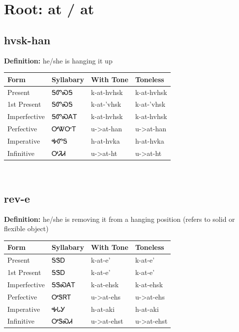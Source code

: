 \documentclass{article}%
\begin{document}
%
\normalsize%
\section*{Root: at / at}%
\subsection*{hvsk-han}%
\textbf{Definition: }%
he/she is hanging it up%
\\[0.5em]%
\begin{tabular}{|l|l|l|l|}%
\hline%
\textbf{Form}&\textbf{Syllabary}&\textbf{With Tone}&\textbf{Toneless}\\%
\hline%
Present&ᎦᏛᏍᎦ&k{-}at{-}hvhsk&k{-}at{-}hvhsk\\%
1st Present&ᎦᏛᏍᎦ&k{-}at{-}'vhsk&k{-}at{-}'vhsk\\%
Imperfective&ᎦᏛᏍᎪᎢ&k{-}at{-}hvhsk&k{-}at{-}hvhsk\\%
Perfective&ᎤᏔᏅᎢ&u{-}>at{-}han&u{-}>at{-}han\\%
Imperative&ᎭᏛᎦ&h{-}at{-}hvka&h{-}at{-}hvka\\%
Infinitive&ᎤᏘᏗ&u{-}>at{-}ht&u{-}>at{-}ht\\%
\hline%
\end{tabular}%
\\[1em]%
\subsection*{rev-e}%
\textbf{Definition: }%
he/she is removing it from a hanging position (refers to solid or flexible object)%
\\[0.5em]%
\begin{tabular}{|l|l|l|l|}%
\hline%
\textbf{Form}&\textbf{Syllabary}&\textbf{With Tone}&\textbf{Toneless}\\%
\hline%
Present&ᎦᏕᎠ&k{-}at{-}e'&k{-}at{-}e'\\%
1st Present&ᎦᏕᎠ&k{-}at{-}e'&k{-}at{-}e'\\%
Imperfective&ᎦᏕᏍᎪᎢ&k{-}at{-}ehsk&k{-}at{-}ehsk\\%
Perfective&ᎤᏕᏒᎢ&u{-}>at{-}ehs&u{-}>at{-}ehs\\%
Imperative&ᎭᏓᎩ&h{-}at{-}aki&h{-}at{-}aki\\%
Infinitive&ᎤᏕᏍᏗ&u{-}>at{-}ehst&u{-}>at{-}ehst\\%
\hline%
\end{tabular}%
\\[1em]%
\end{document}
